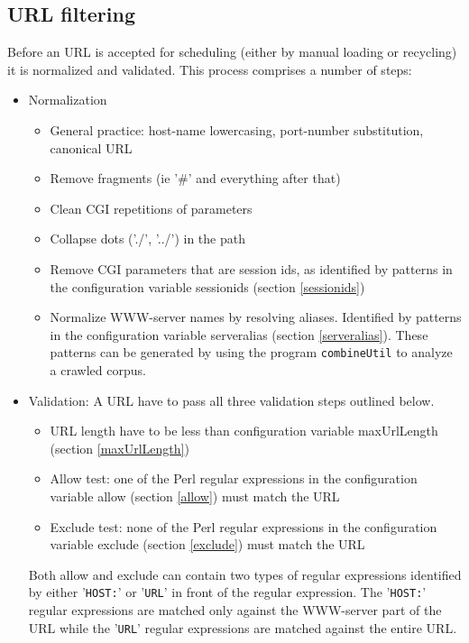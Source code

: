\subsection{URL filtering}
\label{urlfilt}
Before an URL is accepted for scheduling (either by manual loading or
recycling) it is normalized and validated. This process comprises a
number of steps:
\begin{itemize}
\item Normalization
\begin{itemize}
\item General practice: host-name lowercasing, port-number
substitution, canonical URL

\item Remove fragments (ie '\#' and everything after that)

\item Clean CGI repetitions of parameters

\item Collapse dots ('./', '../') in the path

\item Remove CGI parameters that are session ids, as identified by
patterns in the configuration variable sessionids (section \ref{sessionids})

\item Normalize WWW-server names by resolving aliases. Identified by
patterns in the configuration variable serveralias (section \ref{serveralias}).
These patterns can be generated by using the program
{\tt combineUtil} to analyze a crawled corpus.
\end{itemize}

\item Validation: A URL have to pass all three validation steps
outlined below.
\begin{itemize}
\item URL length have to be less than configuration variable
maxUrlLength (section \ref{maxUrlLength})

\item Allow test: one of the Perl regular expressions in the
configuration variable
allow (section \ref{allow}) must match the URL

\item Exclude test: none of the Perl regular expressions in the
configuration variable
 exclude (section \ref{exclude}) must match the URL

\end{itemize}
Both allow and exclude can contain two types of regular expressions
identified by either '{\tt HOST:}' or '{\tt URL}' in front of the
regular expression. The '{\tt HOST:}' regular expressions are matched only against the
WWW-server part of the URL while the '{\tt URL}' regular expressions
are matched against the entire URL.
\end{itemize}


